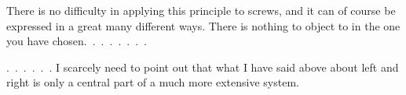 %
There is no difficulty in applying this principle to screws, and it can of course be expressed in a great many different ways. There is nothing to object to in the one you have chosen.~\mbox{.\ .\ .\ .\ .\ .\ .}

\mbox{.\ .\ .\ .\ .\ .} I scarcely need to point out that what I have said above about left and right is only a central part of a much more extensive system.

\par\bigskip

